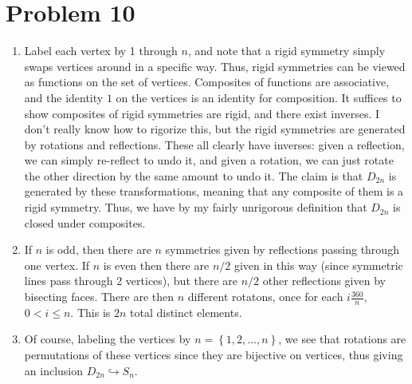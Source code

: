 \documentclass[11pt, letterpaper]{article}
\begin{document}
\section{Problem 10}
\begin{enumerate}
	\item Label each vertex by 1 through $n$, and note that a rigid symmetry simply swaps vertices around in a specific way. Thus, rigid symmetries can be viewed as functions on the set of vertices. Composites of functions are associative, and the identity $1$ on the vertices is an identity for composition. It suffices to show composites of rigid symmetries are rigid, and there exist inverses. I don't really know how to rigorize this, but the rigid symmetries are generated by rotations and reflections. These all clearly have inverses: given a reflection, we can simply re-reflect to undo it, and given a rotation, we can just rotate the other direction by the same amount to undo it. The claim is that $D_{2n}$ is generated by these transformations, meaning that any composite of them is a rigid symmetry. Thus, we have by my fairly unrigorous definition that $D_{2n} $ is closed under composites.
	\item If $n$ is odd, then there are $n$ symmetries given by reflections passing through one vertex. If $n$ is even then there are $n/2$ given in this way (since symmetric lines pass through 2 vertices), but there are $n/2$ other reflections given by bisecting faces. There are then $n$ different rotatons, once for each $i \frac{360}{n} $, $0<i\leq n$. This is $2n$ total distinct elements.
	\item Of course, labeling the vertices by $n=\left\{ 1,2, \ldots , n \right\} $, we see that rotations are permutations of these vertices since they are bijective on vertices, thus giving an inclusion $D_{2n} \hookrightarrow S_n$.
\end{enumerate}
\end{document}
